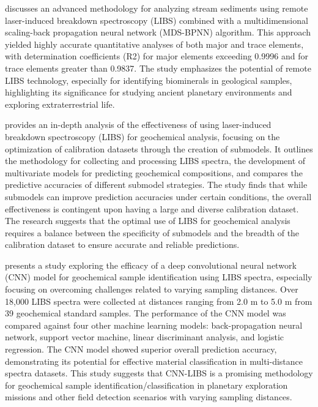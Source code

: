 \citet{wangDeterminationElementalComposition2023} discusses an advanced methodology for analyzing stream sediments using remote laser-induced breakdown spectroscopy (LIBS) combined with a multidimensional scaling-back propagation neural network (MDS-BPNN) algorithm.
This approach yielded highly accurate quantitative analyses of both major and trace elements, with determination coefficients (R2) for major elements exceeding 0.9996 and for trace elements greater than 0.9837.
The study emphasizes the potential of remote LIBS technology, especially for identifying biominerals in geological samples, highlighting its significance for studying ancient planetary environments and exploring extraterrestrial life.

\citet{leporeQuantitativePredictionAccuracies2022a} provides an in-depth analysis of the effectiveness of using laser-induced breakdown spectroscopy (LIBS) for geochemical analysis, focusing on the optimization of calibration datasets through the creation of submodels.
It outlines the methodology for collecting and processing LIBS spectra, the development of multivariate models for predicting geochemical compositions, and compares the predictive accuracies of different submodel strategies.
The study finds that while submodels can improve prediction accuracies under certain conditions, the overall effectiveness is contingent upon having a large and diverse calibration dataset.
The research suggests that the optimal use of LIBS for geochemical analysis requires a balance between the specificity of submodels and the breadth of the calibration dataset to ensure accurate and reliable predictions.

\citet{yangLaserinducedBreakdownSpectroscopy2022} presents a study exploring the efficacy of a deep convolutional neural network (CNN) model for geochemical sample identification using LIBS spectra, especially focusing on overcoming challenges related to varying sampling distances.
Over 18,000 LIBS spectra were collected at distances ranging from 2.0 m to 5.0 m from 39 geochemical standard samples.
The performance of the CNN model was compared against four other machine learning models: back-propagation neural network, support vector machine, linear discriminant analysis, and logistic regression.
The CNN model showed superior overall prediction accuracy, demonstrating its potential for effective material classification in multi-distance spectra datasets.
This study suggests that CNN-LIBS is a promising methodology for geochemical sample identification/classification in planetary exploration missions and other field detection scenarios with varying sampling distances.


